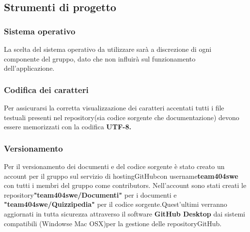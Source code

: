 \documentclass[a4paper,11pt]{article}
\begin{document}
		
		\subsection{Strumenti di progetto} \label{s:strum} 	
	
		\subsubsection{Sistema operativo}
		La scelta del sistema operativo da utilizzare sarà a discrezione di ogni componente del gruppo, dato che non influirà sul funzionamento dell'applicazione.
		\subsubsection{Codifica dei caratteri}
		Per assicurarsi la corretta visualizzazione dei caratteri accentati tutti i file testuali presenti nel repository\addglos(sia codice sorgente che documentazione) devono essere memorizzati con la codifica\textbf{ UTF-8\addglos.}
		\subsubsection{Versionamento}
		Per il versionamento dei documenti e del codice sorgente è stato creato un account per il gruppo sul servizio di hosting\addglos GitHub\addglos con username\addglos \textbf{team404swe\addglos} con tutti i membri del gruppo come contributors\addglos . Nell'account sono stati creati le repository\addglos \textbf{"team404swe/Documenti"} per i documenti e \textbf{"team404swe/Quizzipedia"\addglos} per il codice sorgente.Quest'ultimi verranno aggiornati in tutta sicurezza attraverso  il software \textbf{GitHub Desktop\addglos} dai sistemi compatibili (Windows\addglos e Mac OSX\addglos)per la gestione delle repository\addglos GitHub\addglos. 
				
\end{document}
